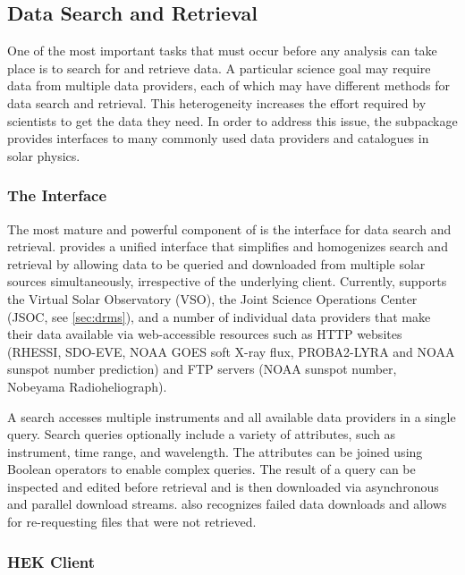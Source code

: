 
\subsection{Data Search and Retrieval}
\label{sec:fido}

One of the most important tasks that must occur before any analysis can take place is to search for and retrieve data.
A particular science goal may require data from multiple data providers, each of which may have different methods for data search and retrieval.
This heterogeneity increases the effort required by scientists to get the data they need.
In order to address this issue, the  subpackage provides interfaces to many commonly used data providers and catalogues in solar physics.

\subsubsection{The \Fido Interface}
\label{sec:fido}

The most mature and powerful component of  is the \Fido interface for data search and retrieval.
\Fido provides a unified interface that simplifies and homogenizes search and retrieval by allowing data to be queried and downloaded from multiple solar sources simultaneously, irrespective of the underlying client.
Currently, \Fido supports the Virtual Solar Observatory (VSO), the Joint Science Operations Center (JSOC, see \autoref{sec:drms}), and a number of individual data providers that make their data available via web-accessible resources such as HTTP websites (RHESSI, SDO-EVE, NOAA GOES soft X-ray flux, PROBA2-LYRA and NOAA sunspot number prediction) and FTP servers (NOAA sunspot number, Nobeyama Radioheliograph).

A \Fido search accesses multiple instruments and all available data providers in a single query.
Search queries optionally include a variety of attributes, such as instrument, time range, and wavelength.
The attributes can be joined using Boolean operators to enable complex queries.
The result of a \Fido query can be inspected and edited before retrieval and is then downloaded via asynchronous and parallel download streams.
\Fido also recognizes failed data downloads and allows for re-requesting files that were not retrieved.

\subsubsection{HEK Client}
\label{sec:hek}

